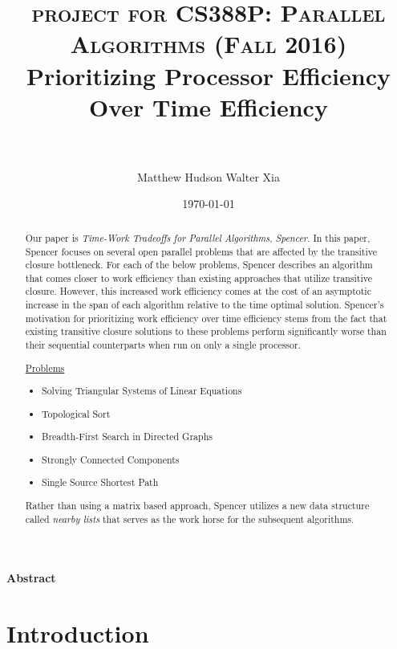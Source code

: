 \documentclass[paper=a4, fontsize=11pt]{scrartcl} %
\title{	
\normalfont \normalsize 
\textsc{project for CS388P: Parallel Algorithms (Fall 2016)} 
\horrule{0.5pt} \\[0.4cm] %
\huge Prioritizing Processor Efficiency Over Time Efficiency \\ %
\horrule{2pt} \\[0.5cm] %
}
\author{Matthew Hudson \hspace{5mm} Walter Xia }	%
\date{\normalsize\today} %
\numberwithin{equation}{section} %
\numberwithin{figure}{section} %
\numberwithin{table}{section} %
\begin{document}
\maketitle %

\justify
\textbf{Abstract}

\begin{abstract}
Our paper is \textit{Time-Work Tradeoffs for Parallel Algorithms}, \textit{Spencer\cite{S97}}. In this paper, Spencer focuses on several open parallel problems that are affected by the transitive closure bottleneck. For each of the below problems, Spencer describes an algorithm that comes closer to work efficiency than existing approaches that utilize transitive closure. However, this increased work efficiency comes at the cost of an asymptotic increase in the span of each algorithm relative to the time optimal solution. Spencer's motivation for prioritizing work efficiency over time efficiency stems from the fact that existing transitive closure solutions to these problems perform significantly worse than their sequential counterparts when run on only a single processor.

\underline{Problems}
\begin{itemize}
\item Solving Triangular Systems of Linear Equations
\item Topological Sort
\item Breadth-First Search in Directed Graphs
\item Strongly Connected Components
\item Single Source Shortest Path
\end{itemize}

Rather than using a matrix based approach, Spencer utilizes a new data structure called \textit{nearby lists} that serves as the work horse for the subsequent algorithms. \\
\end{abstract}


\section{Introduction}
\end{document}
